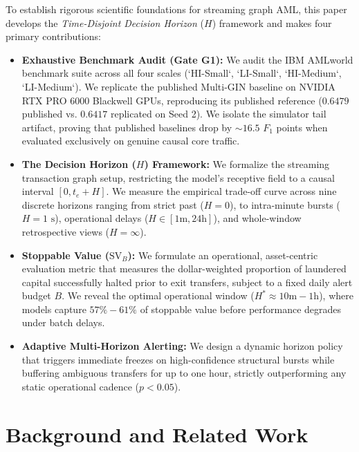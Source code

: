 \documentclass[10pt,twocolumn,letterpaper]{article}
\begin{document}
To establish rigorous scientific foundations for streaming graph AML, this paper develops the \emph{Time-Disjoint Decision Horizon} ($H$) framework and makes four primary contributions:
\begin{itemize}[leftmargin=*]
    \item \textbf{Exhaustive Benchmark Audit (Gate G1):} We audit the IBM AMLworld benchmark suite across all four scales (`HI-Small`, `LI-Small`, `HI-Medium`, `LI-Medium`). We replicate the published Multi-GIN baseline on NVIDIA RTX PRO 6000 Blackwell GPUs, reproducing its published reference ($0.6479$ published vs. $0.6417$ replicated on Seed 2). We isolate the simulator tail artifact, proving that published baselines drop by $\sim16.5$ $F_1$ points when evaluated exclusively on genuine causal core traffic.
    \item \textbf{The Decision Horizon ($H$) Framework:} We formalize the streaming transaction graph setup, restricting the model's receptive field to a causal interval $[0, t_e + H]$. We measure the empirical trade-off curve across nine discrete horizons ranging from strict past ($H=0$), to intra-minute bursts ($H=1\text{ s}$), operational delays ($H\in[1\text{m}, 24\text{h}]$), and whole-window retrospective views ($H=\infty$).
    \item \textbf{Stoppable Value ($\text{SV}_B$):} We formulate an operational, asset-centric evaluation metric that measures the dollar-weighted proportion of laundered capital successfully halted prior to exit transfers, subject to a fixed daily alert budget $B$. We reveal the optimal operational window ($H^* \approx 10\text{m} - 1\text{h}$), where models capture $57\% - 61\%$ of stoppable value before performance degrades under batch delays.
    \item \textbf{Adaptive Multi-Horizon Alerting:} We design a dynamic horizon policy that triggers immediate freezes on high-confidence structural bursts while buffering ambiguous transfers for up to one hour, strictly outperforming any static operational cadence ($p < 0.05$).
\end{itemize}

\section{Background and Related Work}
\label{sec:related}
\end{document}
